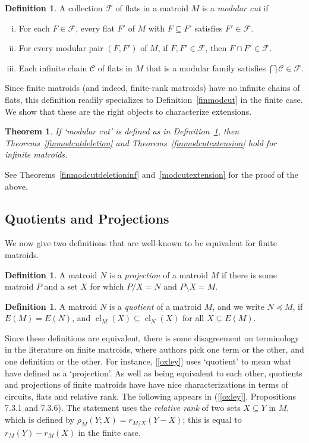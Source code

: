 \documentclass{amsart}
\theoremstyle{plain}
\newtheorem{theorem}{Theorem}[section]
\newcounter{defn}
\theoremstyle{definition}
\newtheorem{definition}[defn]{Definition}
\newcommand{\cC}{\mathcal{C}}
\newcommand{\cF}{\mathcal{F}}
\DeclareMathOperator{\cl}{cl}
\newcommand{\del}{\!\setminus\!}
\newcommand{\con}{/}
\renewcommand{\ss}{\subseteq}
\newcommand{\relrank}[3]{\rho_{#1}({#2};{#3})}
\begin{document}
\begin{definition}\label{infmodcut}
  A collection $\cF$ of flats in a matroid $M$ is a \emph{modular cut} if
  \begin{enumerate}[(i)]
  \item\label{superflat} 
    For each $F \in \cF$, every flat $F'$ of $M$ with $F \subseteq F'$ satisfies $F' \in \cF$. 
  \item\label{forallmodpair}
    For every modular pair $(F,F')$ of $M$, if $F, F' \in \cF$, then $F \cap F' \in \cF$.
  \item\label{forallmodchain} 
    Each infinite chain $\cC$ of flats in $M$ that is a modular family satisfies
    $\bigcap \cC \in \cF$. 
  \end{enumerate}
\end{definition}

Since finite matroids (and indeed, finite-rank matroids) have no infinite chains of flats,
this definition readily specializes to Definition~\ref{finmodcut}
in the finite case. We show that these are the right objects to characterize extensions. 
\begin{theorem}
  If `modular cut' is defined as in Definition~\ref{infmodcut}, 
  then Theorems~\ref{finmodcutdeletion} and Theorems~\ref{finmodcutextension} 
  hold for infinite matroids. 
\end{theorem}

See Theorems~\ref{finmodcutdeletioninf} and~\ref{modcutextension} for the proof of the above. 

\subsection*{Quotients and Projections}

We now give two definitions that are well-known to be equivalent for finite matroids. 

\begin{definition}
A matroid $N$ is a \emph{projection} of a matroid $M$
if there is some matroid $P$ and a set $X$ for which $P \con X = N$ and $P \del X = M$. 
\end{definition}

\begin{definition}
  A matroid $N$ is a \emph{quotient} of a matroid $M$, and we write $N \preceq M$,
  if $E(M) = E(N)$, and $\cl_M(X) \ss \cl_N(X)$ for all $X \ss E(M)$. 
\end{definition}

Since these definitions are equivalent,
there is some disagreement on terminology in the literature on finite matroids,
where authors pick one term or the other, and one definition or the other.
For instance, [\ref{oxley}] uses `quotient' to mean what have defined as a `projection'. 
As well as being equivalent to each other, quotients and projections of finite matroids have
have nice characterizations in terms of circuits, flats and relative rank. 
The following appears in ([\ref{oxley}], Propositions 7.3.1 and 7.3.6).
The statement uses the \emph{relative rank} of two sets $X \ss Y$ in $M$, 
which is defined by $\relrank{M}{Y}{X} = r_{M \con X}(Y-X)$; this is equal to $r_M(Y) - r_M(X)$ in the finite case.
\end{document}
